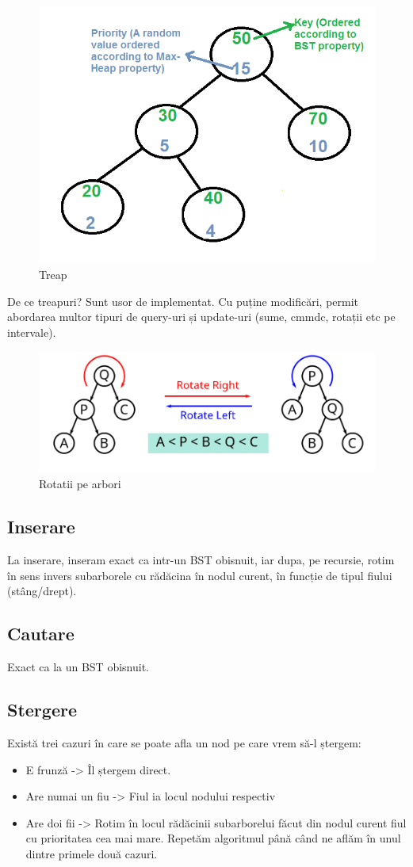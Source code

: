 \documentclass[11pt,a4paper]{article}
\theoremstyle{definition}
\theoremstyle{plain}
\theoremstyle{remark}
\begin{document}
\begin{figure}[H]
    \centering
    \includegraphics[width=0.5\linewidth]{treap1.png}
    \caption{Treap}
    \label{fig:enter-label}
\end{figure}

De ce treapuri? Sunt usor de implementat. Cu puține modificări, permit abordarea multor tipuri de query-uri și update-uri (sume, cmmdc, rotații etc pe intervale).

\begin{figure}[H]
    \centering
    \includegraphics[width=0.5\linewidth]{rotatii1.png}
    \caption{Rotatii pe arbori}
    \label{fig:enter-label}
\end{figure}

\subsection*{Inserare}
La inserare, inseram exact ca intr-un BST obisnuit, iar dupa, pe recursie, rotim în sens invers subarborele cu rădăcina în nodul curent, în funcție de tipul fiului (stâng/drept).

\subsection*{Cautare}
Exact ca la un BST obisnuit.

\subsection*{Stergere}
Există trei cazuri în care se poate afla un nod pe care vrem să-l ștergem:

\begin{itemize}
    \item E frunză -> Îl ștergem direct.
    \item Are numai un fiu -> Fiul ia locul nodului respectiv
    \item Are doi fii -> Rotim în locul rădăcinii subarborelui făcut din nodul curent fiul cu prioritatea cea mai mare. Repetăm algoritmul până când ne aflăm în unul dintre primele două cazuri.
\end{itemize}
\end{document}
